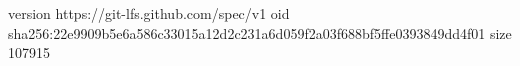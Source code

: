 version https://git-lfs.github.com/spec/v1
oid sha256:22e9909b5e6a586c33015a12d2c231a6d059f2a03f688bf5ffe0393849dd4f01
size 107915
